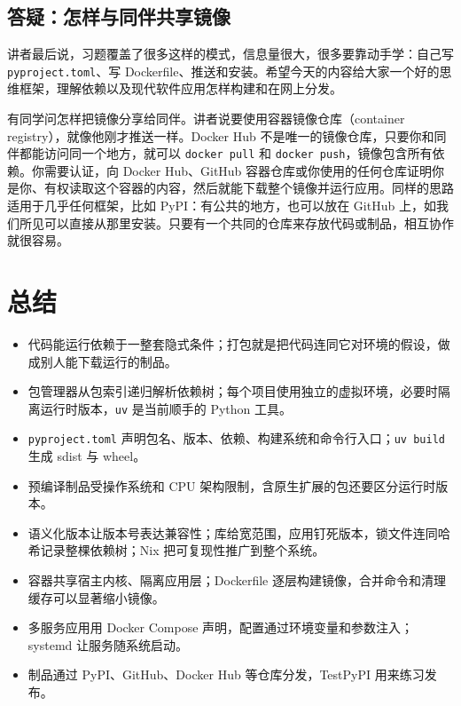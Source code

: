 \documentclass[a4paper]{article}
\begin{document}
\subsection{答疑：怎样与同伴共享镜像}

讲者最后说，习题覆盖了很多这样的模式，信息量很大，很多要靠动手学：自己写 \texttt{pyproject.toml}、写 Dockerfile、推送和安装。希望今天的内容给大家一个好的思维框架，理解依赖以及现代软件应用怎样构建和在网上分发。

有同学问怎样把镜像分享给同伴。讲者说要使用容器镜像仓库（container registry），就像他刚才推送一样。Docker Hub 不是唯一的镜像仓库，只要你和同伴都能访问同一个地方，就可以 \texttt{docker pull} 和 \texttt{docker push}，镜像包含所有依赖。你需要认证，向 Docker Hub、GitHub 容器仓库或你使用的任何仓库证明你是你、有权读取这个容器的内容，然后就能下载整个镜像并运行应用。同样的思路适用于几乎任何框架，比如 PyPI：有公共的地方，也可以放在 GitHub 上，如我们所见可以直接从那里安装。只要有一个共同的仓库来存放代码或制品，相互协作就很容易。

\section{总结}

\begin{itemize}
\item 代码能运行依赖于一整套隐式条件；打包就是把代码连同它对环境的假设，做成别人能下载运行的制品。
\item 包管理器从包索引递归解析依赖树；每个项目使用独立的虚拟环境，必要时隔离运行时版本，\texttt{uv} 是当前顺手的 Python 工具。
\item \texttt{pyproject.toml} 声明包名、版本、依赖、构建系统和命令行入口；\texttt{uv build} 生成 sdist 与 wheel。
\item 预编译制品受操作系统和 CPU 架构限制，含原生扩展的包还要区分运行时版本。
\item 语义化版本让版本号表达兼容性；库给宽范围，应用钉死版本，锁文件连同哈希记录整棵依赖树；Nix 把可复现性推广到整个系统。
\item 容器共享宿主内核、隔离应用层；Dockerfile 逐层构建镜像，合并命令和清理缓存可以显著缩小镜像。
\item 多服务应用用 Docker Compose 声明，配置通过环境变量和参数注入；systemd 让服务随系统启动。
\item 制品通过 PyPI、GitHub、Docker Hub 等仓库分发，TestPyPI 用来练习发布。
\end{itemize}
\end{document}
